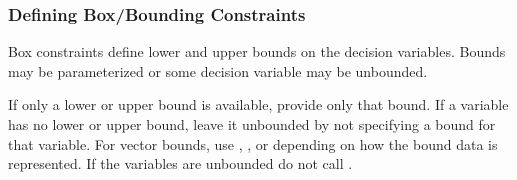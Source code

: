 \documentclass[letterpaper,10pt,english,openany,oneside]{sphinxmanual}
\begin{document}
\subsubsection{Defining Box/Bounding Constraints}
\label{\detokenize{user-guide/defining-the-problem:defining-box-bounding-constraints}}
\sphinxAtStartPar
Box constraints define lower and upper bounds on the decision variables. Bounds may be parameterized or some decision variable may be unbounded.

\begin{sphinxVerbatim}[commandchars=\\\{\}]
                             
                             
\end{sphinxVerbatim}

\begin{sphinxVerbatim}[commandchars=\\\{\}]
  
\end{sphinxVerbatim}

\sphinxAtStartPar
If only a lower or upper bound is available, provide only that bound. If a variable has no lower or upper bound, leave it unbounded by not specifying a bound for that variable. For vector bounds, use , , or  depending on how the bound data is represented. If the variables are unbounded do not call .
\end{document}
